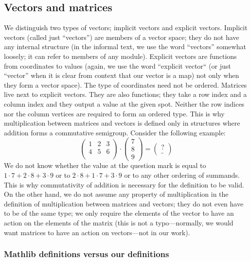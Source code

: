 \documentclass[]{article}
\renewcommand{\.}{\hskip .75pt}
\let\*=\cdot
\begin{document}
\subsection{Vectors and matrices}

We distinguish two types of vectors; implicit vectors and explicit vectors.
Implicit vectors (called just ``vectors'') are members of a vector space;
they do not have any internal structure
(in the informal text, we use the word ``vectors'' somewhat loosely;
it can refer to members of any module).
Explicit vectors are functions from coordinates to values (again, we use the word
``explicit vector`` (or just ``vector'' when it is clear from context that our vector
is a map) not only when they form a vector space).
The type of coordinates need not be ordered.
Matrices live next to explicit vectors. They are also functions; they take a row index
and a column index and they output a value at the given spot.
Neither the row indices nor the column vertices are required to form an ordered type.
This is why multiplication between matrices and vectors is defined only in structures
where addition forms a commutative semigroup. Consider the following example:
$$
\begin{pmatrix}
	1 & 2 & 3 \\
	4 & 5 & 6 \\
\end{pmatrix}
\*
\begin{pmatrix}
	7 \\ 8 \\ 9
\end{pmatrix}
=
\begin{pmatrix}
	? \\ \_
\end{pmatrix}
$$
We do not know whether the value at the question mark is equal to
$ 1 \* 7 + 2 \* 8 + 3 \* 9 $ or to
$ 2 \* 8 + 1 \* 7 + 3 \* 9 $ or to
any other ordering of summands.
This is why commutativity of addition is necessary for the definition to be valid.
On the other hand, we do not assume any property of multiplication in the
definition of multiplication between matrices and vectors; they do not even
have to be of the same type; we only require the elements of the vector
to have an action on the elements of the matrix (this is not a typo\:---\:normally,
we would want matrices to have an action on vectors\:---\:not in our work).

\subsubsection{Mathlib definitions versus our definitions}
\end{document}
